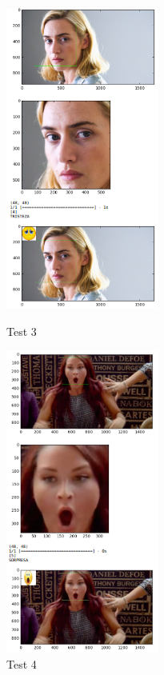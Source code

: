 \begin{frame}

\begin{figure}[!htbp]
    
    \begin{multicols}{2}
     \includegraphics[angle=0,width=50mm]{Imagenes/test3.png}
       \caption{Test 3}
       \label{fig:test3}   
       
       \includegraphics[angle=0,width=50mm]{Imagenes/test4.png}
           \caption{Test 4}
           \label{fig:test4} 


\end{multicols}
\end{figure}
\end{frame}
